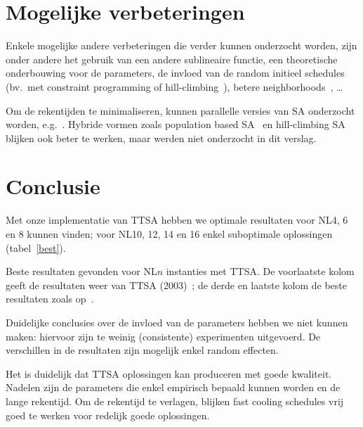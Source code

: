 \documentclass[a4paper,dutch,11pt,]{scrartcl}
\begin{document}
\newpage

\section{Mogelijke verbeteringen}
Enkele mogelijke andere verbeteringen die verder kunnen onderzocht worden, zijn onder andere het gebruik van een andere sublineaire functie, 
een theoretische onderbouwing voor de parameters, de invloed van de random initieel schedules (bv.\ met constraint programming of hill-climbing~\cite{paper2}), betere neighborhoods~\cite{betterneighborhood}, \ldots 

Om de rekentijden te minimaliseren, kunnen parallelle versies van SA onderzocht worden, e.g.~\cite{metaheuristics,parallelSA,parallelSA2}.
Hybride vormen zoals population based SA~\cite{populationSA} en hill-climbing SA~\cite{hybrid} blijken ook beter te werken, maar werden niet onderzocht in dit verslag.


\section{Conclusie}

Met onze implementatie van TTSA hebben we optimale resultaten voor NL4, 6 en 8 kunnen vinden; voor NL10, 12, 14 en 16 enkel suboptimale oplossingen (tabel~\ref{best}). 


 \begin{table}[hbpt]
 \centering 

\caption{Beste resultaten gevonden voor NL$n$ instanties met TTSA. 
De voorlaatste kolom geeft de resultaten weer van TTSA (2003)~\cite{paper}; de derde en laatste kolom de beste resultaten zoals op~\cite{website}.\label{best}}
\end{table}

Duidelijke conclusies over de invloed van de parameters hebben we niet kunnen maken: hiervoor zijn te weinig (consistente) experimenten uitgevoerd. De verschillen in de resultaten zijn mogelijk enkel random effecten.

Het is duidelijk dat TTSA oplossingen kan produceren met goede kwaliteit. Nadelen zijn de parameters die enkel empirisch bepaald kunnen worden en de lange rekentijd.
Om de rekentijd te verlagen, blijken fast cooling schedules vrij goed te werken voor redelijk goede oplossingen. 


\clearpage

\makeatletter
\def\url@leostyle{%
  \@ifundefined{selectfont}{\def\UrlFont{\sf}}{\def\UrlFont{\small\ttfamily}}}
\makeatother


\end{document}

